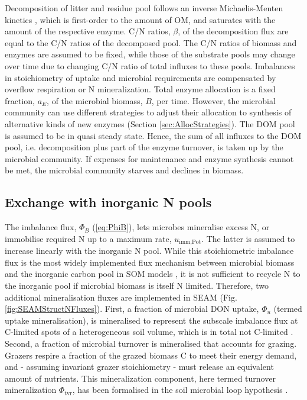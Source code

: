  

Decomposition of litter and residue pool follows an inverse Michaelis-Menten
kinetics \citep{Schimel03}, which is first-order to the amount of OM, and
saturates with the amount of the respective enzyme. C/N ratios, $\beta$, of the
decomposition flux are equal to the C/N ratios of the decomposed pool. The C/N
ratios of biomass and enzymes are assumed to be fixed, while those of the
substrate pools may change over time due to changing C/N ratio of total influxes
to these pools. Imbalances in stoichiometry of uptake and microbial requirements
are compensated by overflow respiration or N mineralization.
Total enzyme allocation is a fixed fraction, $a_E$, of the microbial biomass,
$B$, per time. However, the microbial community can use different strategies to
adjust their allocation to synthesis of alternative kinds of new enzymes
(Section \ref{sec:AllocStrategies}).
The DOM pool is assumed to be in quasi steady state. Hence, the sum of all
influxes to the DOM pool, i.e. decomposition plus part of the enzyme turnover,
is taken up by the microbial community. If expenses for maintenance and enzyme
synthesis cannot be met, the microbial community starves and declines in
biomass.

\subsection{Exchange with inorganic N pools}


The imbalance flux, $\Phi_B$ (\ref{eq:PhiB}), lets microbes mineralise excess N,
or immobilise required N up to a maximum rate, $u_{\operatorname{imm,Pot}}$. The
latter is assumed to increase linearly with the inorganic N pool.
While this stoichiometric imbalance flux is the most widely implemented flux
mechanism between microbial biomass and the inorganic carbon pool in SOM models
\citep{Manzoni09}, it is not sufficient to recycle N to the inorganic pool if
microbial biomass is itself N limited.
Therefore, two additional mineralisation fluxes are implemented in SEAM (Fig.
\ref{fig:SEAMStructNFluxes}). First, a fraction of microbial DON uptake,
$\Phi_u$ (termed uptake mineralisation), is mineralised to represent the
subscale imbalance flux at C-limited spots of a heterogeneous soil volume, which
is in total not C-limited \citep{Manzoni08}.
Second, a fraction of microbial turnover is mineralised that accounts for
grazing. Grazers respire a fraction of the grazed biomass C to meet their energy
demand, and - assuming invariant grazer stoichiometry  - must release an
equivalent amount of nutrients.
This mineralization component, here termed turnover mineralization
$\Phi_{\operatorname{tvr}}$, has been formalised in the soil microbial loop
hypothesis \citep{Clarholm85, Raynaud06}.

